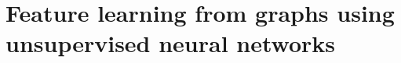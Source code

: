 

\newcommand{\mdaarchitectures}{$128$D embeddings were generated by $256$-$128$, $512$-$128$, $1024$-$128$, $256$-$256$-$128$, $512$-$256$-$128$ and $512$-$512$-$128$ MDAE architectures. $256$D embeddings were generated by $256$-$256$, $512$-$256$ and $512$-$512$-$256$ MDAE architectures.}

\chapter{Feature learning from graphs using unsupervised neural networks}
\label{chapter:network-fusion}


